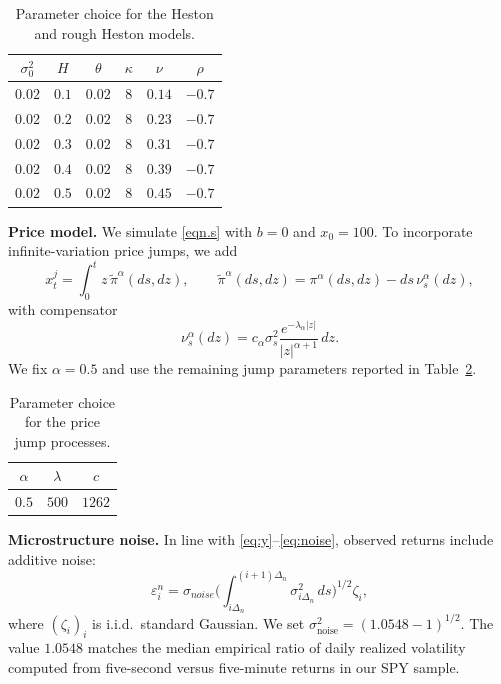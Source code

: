 \documentclass[ecta,nameyear,draft]{econsocart}
\def\wt{\widetilde}
\newcommand{\1}{\mathbf 1}
\numberwithin{equation}{section}
\begin{document}
    \begin{table}[htbp]
        \begin{tabular}{cccccc}
        \hline 
        $\sigma_0^2$ & $H$ & $\theta$ & $\kappa$ & $\nu$ & $\rho$\\
        \hline 
        $0.02$ & $0.1$ & $0.02$ & $8$ & $0.14$ & $-0.7$ \\
        $0.02$ & $0.2$ & $0.02$ & $8$ & $0.23$ & $-0.7$ \\
        $0.02$ & $0.3$ & $0.02$ & $8$ & $0.31$ & $-0.7$ \\
        $0.02$ & $0.4$ & $0.02$ & $8$ & $0.39$ & $-0.7$ \\
        $0.02$ & $0.5$ & $0.02$ & $8$ & $0.45$ & $-0.7$ \\
        \hline
        \end{tabular}
        \caption{Parameter choice for the Heston and rough Heston models.}
        \label{tab:heston}
    \end{table}%



\textbf{Price model.} We simulate \eqref{eqn.s} with $b=0$ and $x_0=100$. To incorporate infinite-variation price jumps, we add
\begin{equation*}
    x^{j}_t = \int_0^t z \, \wt \pi^{\alpha}(ds, dz),\qquad \wt \pi^\alpha(ds,dz)=\pi^\alpha(ds,dz)-ds\,\nu_s^\alpha(dz),
\end{equation*}
with compensator
\begin{equation*}
    \nu^{\alpha}_s(dz) = c_\alpha \sigma_s^2 \frac{e^{-\lambda_\alpha|z|}}{|z|^{\alpha+1}} \, dz.
\end{equation*}
We fix $\alpha=0.5$ and use the remaining jump parameters reported in Table~\ref{tab:jumps}.

\begin{table}[htbp]
        \begin{tabular}{ccc}
        \hline
        $\alpha$ & $\lambda$ & $c$\\
        \hline 
        $0.5$ & $500$ & $1262$ \\
        \hline
        \end{tabular}
        \caption{Parameter choice for the price jump processes.}
        \label{tab:jumps}
\end{table}




\textbf{Microstructure noise. } In line with \eqref{eq:y}--\eqref{eq:noise}, observed returns include additive noise:
\begin{equation*}
    \varepsilon_i^n = \sigma_{noise} \Big(\int_{i\Delta_n}^{(i+1)\Delta_n}\sigma_{i\Delta_n}^2 \, ds\Big)^{1/2} \zeta_i,
\end{equation*}
where $(\zeta_i)_i$ is i.i.d.\ standard Gaussian. We set $\sigma_{\text{noise}}^2 = (1.0548 - 1)^{1/2}$. The value $1.0548$ matches the median empirical ratio of daily realized volatility computed from five-second versus five-minute returns in our SPY sample. \\
\end{document}
